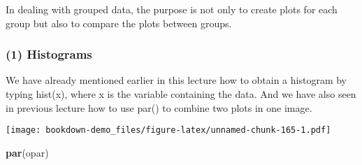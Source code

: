 \documentclass[]{book}
\newenvironment{Shaded}{\begin{snugshade}}{\end{snugshade}}
\newcommand{\KeywordTok}[1]{\textcolor[rgb]{0.13,0.29,0.53}{\textbf{#1}}}
\newcommand{\DataTypeTok}[1]{\textcolor[rgb]{0.13,0.29,0.53}{#1}}
\newcommand{\DecValTok}[1]{\textcolor[rgb]{0.00,0.00,0.81}{#1}}
\newcommand{\StringTok}[1]{\textcolor[rgb]{0.31,0.60,0.02}{#1}}
\newcommand{\OperatorTok}[1]{\textcolor[rgb]{0.81,0.36,0.00}{\textbf{#1}}}
\newcommand{\NormalTok}[1]{#1}
\theoremstyle{definition}
\theoremstyle{definition}
\theoremstyle{definition}
\theoremstyle{remark}
\begin{document}
In dealing with grouped data, the purpose is not only to create plots
for each group but also to compare the plots between groups.

\subsubsection{(1) Histograms}\label{histograms-1}

We have already mentioned earlier in this lecture how to obtain a
histogram by typing hist(x), where x is the variable containing the
data. And we have also seen in previous lecture how to use par() to
combine two plots in one image.

\begin{Shaded}
\end{Shaded}

\texttt{[image: bookdown-demo\_files/figure-latex/unnamed-chunk-165-1.pdf]}

\begin{Shaded}
\begin{Highlighting}[]
\KeywordTok{par}\NormalTok{(opar)}
\end{Highlighting}
\end{Shaded}
\end{document}
